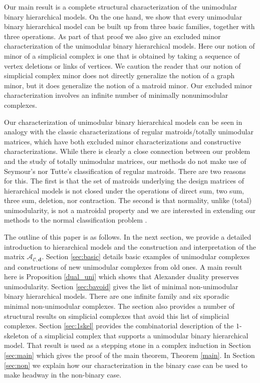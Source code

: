 \documentclass[letterpaper,12pt]{amsart}
\theoremstyle{plain}
\theoremstyle{definition}
\theoremstyle{remark}
\newcommand{\bfd}{\mathbf{d}}
\newcommand{\calc}{\mathcal{C}}
\begin{document}
Our main result is a complete structural characterization of the 
unimodular binary hierarchical models.  On the one hand, we show that
every unimodular binary hierarchical model can be built up
from three basic families, together with three operations.
As part of that proof we also give an excluded minor characterization
of the unimodular binary hierarchical models.  Here our notion of minor
of a simplicial complex is one that is obtained by taking a sequence of
vertex deletions or links of vertices.
{We caution the reader that our notion of simplicial complex minor
does not directly generalize the notion of a graph minor, but it does generalize the notion of a matroid minor.}
Our excluded minor characterization
involves an infinite number of minimally nonunimodular complexes.

Our characterization of unimodular binary hierarchical models can be
seen in analogy with the classic characterizations of 
regular matroids/totally unimodular matrices, which have both
excluded minor characterizations and constructive characterizations.
{While there is clearly a close connection between our problem and the
study of totally unimodular matrices, our methods do not make use of
Seymour's \cite{Seymour1980} nor Tutte's \cite{tutte1958} classification of regular matroids.
There are two reasons for this.
The first is that the set of matroids underlying the design matrices of hierarchical models
is not closed under the operations of direct sum, two sum, three sum, deletion, nor contraction.
The second is that normality, unlike (total) unimodularity, is not a matroidal property
and we are interested in extending our methods to the normal classification problem \cite{bernstein-sullivant2015}.
}

The outline of this paper is as follows.  In the next section,
we provide a detailed introduction to hierarchical models and the construction
and interpretation of the matrix $\mathcal{A}_{\calc, \bfd}$.  
Section \ref{sec:basic} details basic examples of unimodular complexes
and constructions of new unimodular complexes from old ones.
A main result here is Proposition \ref{dual_uni} which shows that Alexander duality
preserves unimodularity.
Section \ref{sec:bavoid} gives the list of minimal non-unimodular binary hierarchical
models.  There are one infinite family and six sporadic minimal non-unimodular complexes.
The section also provides a number of structural results on simplicial complexes
that avoid this list of simplicial complexes.  Section \ref{sec:1skel} provides
the combinatorial description of the $1$-skeleton of a simplicial
complex that supports a unimodular binary hierarchical model.  That result
is used as a stepping stone in a complex induction in Section \ref{sec:main}
which gives the proof of the main theorem, Theorem \ref{main}.
In Section \ref{sec:non} we explain how our characterization in the binary case
can be used to make headway in the non-binary case.
\end{document}
